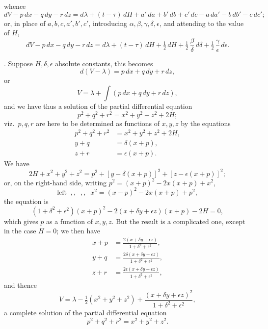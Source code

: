 \documentclass[11pt,a4paper]{article}
\begin{document}
\newpage


whence
\[
dV - p\,dx - q\,dy - r\,dz = d\lambda + (t - \tau)\,dH + a'\,da + b'\,db + c'\,dc - a\,da' - b\,db' - c\,dc';
\]
or, in place of $a, b, c, a', b', c'$, introducing $\alpha, \beta, \gamma, \delta, \epsilon$, and attending to the value of $H$,
\[
dV - p\,dx - q\,dy - r\,dz = d\lambda + (t - \tau)\,dH + \tfrac{1}{2}\,d H + \tfrac{1}{2}\,\frac{\beta}{\delta}\,d\delta + \tfrac{1}{2}\,\frac{\gamma}{\epsilon}\,d\epsilon.
\]

\medskip

. Suppose $H, \delta, \epsilon$ absolute constants, this becomes
\[
d(V - \lambda) = p\,dx + q\,dy + r\,dz,
\]
or
\[
V = \lambda + \int (p\,dx + q\,dy + r\,dz),
\]
and we have thus a solution of the partial differential equation
\[
p^{2} + q^{2} + r^{2} = x^{2} + y^{2} + z^{2} + 2H;
\]
viz.\ $p, q, r$ are here to be determined as functions of $x, y, z$ by the equations
\[
\begin{aligned}
p^{2} + q^{2} + r^{2} &= x^{2} + y^{2} + z^{2} + 2H, \\
y + q &= \delta(x + p), \\
z + r &= \epsilon(x + p).
\end{aligned}
\]
We have
\[
2H + x^{2} + y^{2} + z^{2} = p^{2} + [y - \delta(x + p)]^{2} + [z - \epsilon(x + p)]^{2};
\]
or, on the right-hand side, writing $p^{2} = (x + p)^{2} - 2x(x + p) + x^{2}$,
\[
\text{left}\;\; ,, \;\; ,, \;\; x^{2} = (x - p)^{2} - 2x(x + p) + p^{2},
\]
the equation is
\[
(1 + \delta^{2} + \epsilon^{2})(x + p)^{2} - 2(x + \delta y + \epsilon z)(x + p) - 2H = 0,
\]
which gives $p$ as a function of $x, y, z$. But the result is a complicated one, except in the case $H = 0$; we then have
\[
\begin{aligned}
x + p &= \frac{2(x + \delta y + \epsilon z)}{1 + \delta^{2} + \epsilon^{2}}, \\
y + q &= \frac{2\delta(x + \delta y + \epsilon z)}{1 + \delta^{2} + \epsilon^{2}}, \\
z + r &= \frac{2\epsilon(x + \delta y + \epsilon z)}{1 + \delta^{2} + \epsilon^{2}},
\end{aligned}
\]
and thence
\[
V = \lambda - \tfrac{1}{2}(x^{2} + y^{2} + z^{2}) + \frac{(x + \delta y + \epsilon z)^{2}}{1 + \delta^{2} + \epsilon^{2}},
\]
a complete solution of the partial differential equation
\[
p^{2} + q^{2} + r^{2} = x^{2} + y^{2} + z^{2}.
\]
\end{document}
